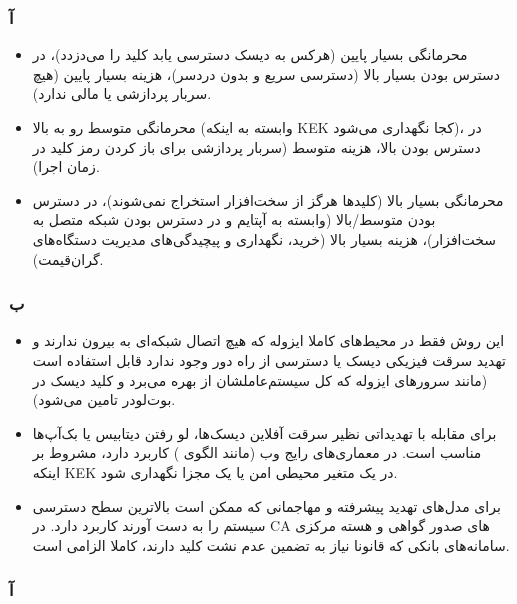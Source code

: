 
\subsubsection*{آ}
\begin{itemize}
    \item  محرمانگی {بسیار پایین} (هرکس به دیسک دسترسی یابد کلید را می‌دزدد)، در دسترس بودن {بسیار بالا} (دسترسی سریع و بدون دردسر)، هزینه {بسیار پایین} (هیچ سربار پردازشی یا مالی ندارد).
    \item محرمانگی {متوسط رو به بالا} (وابسته به اینکه KEK کجا نگهداری می‌شود)، در دسترس بودن {بالا}، هزینه {متوسط} (سربار پردازشی برای باز کردن رمز کلید در زمان اجرا).
    \item محرمانگی {بسیار بالا} (کلیدها هرگز از سخت‌افزار استخراج نمی‌شوند)، در دسترس بودن {متوسط/بالا} (وابسته به آپتایم و در دسترس بودن شبکه متصل به سخت‌افزار)، هزینه {بسیار بالا} (خرید، نگهداری و پیچیدگی‌های مدیریت دستگاه‌های گران‌قیمت).
\end{itemize}

\subsubsection*{ب}
\begin{itemize}
    \item  این روش فقط در محیط‌های کاملا ایزوله که هیچ اتصال شبکه‌ای به بیرون ندارند و تهدید سرقت فیزیکی دیسک یا دسترسی از راه دور وجود ندارد قابل استفاده است (مانند سرورهای ایزوله که کل سیستم‌عاملشان از   بهره می‌برد و کلید دیسک در بوت‌لودر تامین می‌شود).
    \item برای مقابله با تهدیداتی نظیر سرقت آفلاین دیسک‌ها، لو رفتن دیتابیس یا بک‌آپ‌ها مناسب است. در معماری‌های رایج وب (مانند الگوی ) کاربرد دارد، مشروط بر اینکه KEK در یک متغیر محیطی امن یا یک  مجزا نگهداری شود.
    \item برای مدل‌های تهدید پیشرفته و مهاجمانی که ممکن است بالاترین سطح دسترسی سیستم را به دست آورند کاربرد دارد. در CA های صدور گواهی و هسته مرکزی سامانه‌های بانکی که قانونا نیاز به تضمین عدم نشت کلید دارند، کاملا الزامی است.
\end{itemize}



\subsubsection*{آ}

